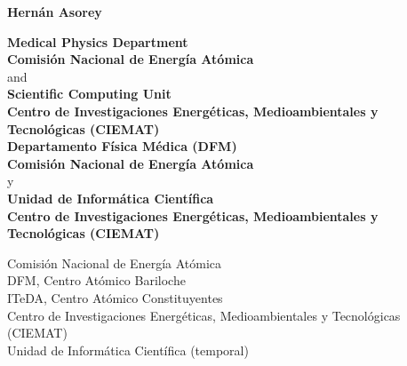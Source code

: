 \begin{center}{\huge \bf Hernán Asorey}\\[1cm]\end{center}

\begin{center}
\ifeng
	{\textbf{Medical Physics Department}}\\
	{\textbf{Comisión Nacional de Energía Atómica}}\\
	and \\
	{\textbf{Scientific Computing Unit}}\\
	{\textbf{Centro de Investigaciones Energéticas, Medioambientales y Tecnológicas (CIEMAT)}}\\

\else
	{\textbf{Departamento Física Médica (DFM)}}\\
	{\textbf{Comisión Nacional de Energía Atómica}}\\
	y \\
	{\textbf{Unidad de Informática Científica}}\\
	{\textbf{Centro de Investigaciones Energéticas, Medioambientales y Tecnológicas (CIEMAT)}}\\
\fi
\end{center}
\begin{minipage}[t]{0.60\textwidth}
	Comisión Nacional de Energía Atómica\\
	\hspace*{1em}DFM, Centro Atómico Bariloche\\
	\hspace*{1em}ITeDA, Centro Atómico Constituyentes\\
 	Centro de Investigaciones Energéticas, Medioambientales y Tecnológicas (CIEMAT)\\
	\hspace*{1em}Unidad de Informática Científica (temporal)\\
\end{minipage}\hspace*{0.02\textwidth}

